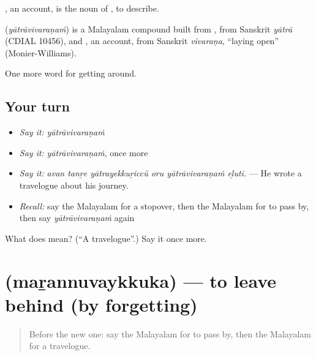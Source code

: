 , an account, is the noun of , to describe.

\begin{cousinweb}
\textbf{} (\emph{yātrāvivaraṇaṁ}) is a Malayalam compound built from , from Sanskrit \emph{yātrā} (CDIAL 10456), and , an account, from Sanskrit \emph{vivaraṇa}, \textquotedblleft{}laying open\textquotedblright{} (Monier-Williams).
\end{cousinweb}

\begin{grammarlens}[title={What you've built}]
One more word for getting around.
\end{grammarlens}

\subsection*{Your turn}
\begin{itemize}
\raggedright
  \item \emph{Say it:} \emph{yātrāvivaraṇaṁ}
  \item \emph{Say it:} \emph{yātrāvivaraṇaṁ}, once more
  \item \emph{Say it:} \emph{avan tanṟe yātrayekkuṟiccŭ oru yātrāvivaraṇaṁ eḻuti.} — He wrote a travelogue about his journey.
  \item \emph{Recall:} say the Malayalam for a stopover, then the Malayalam for to pass by, then say \emph{yātrāvivaraṇaṁ} again
\end{itemize}

\begin{tcolorbox}[breakable,colback=teal!4,colframe=teal!35!black,title={Before you move on}]
What does  mean? (\textquotedblleft{}A travelogue\textquotedblright{}.) Say it once more.
\end{tcolorbox}
\section[\texorpdfstring{\ml{മറന്നുവയ്ക്കുക} (maṟannuvaykkuka)}{മറന്നുവയ്ക്കുക (maṟannuvaykkuka)}]{ (maṟannuvaykkuka) — to leave behind (by forgetting)}

\label{lesson:ML-C480-marannuvaykkuka}



\begin{quote}
Before the new one: say the Malayalam for to pass by, then the Malayalam for a travelogue.
\end{quote}

